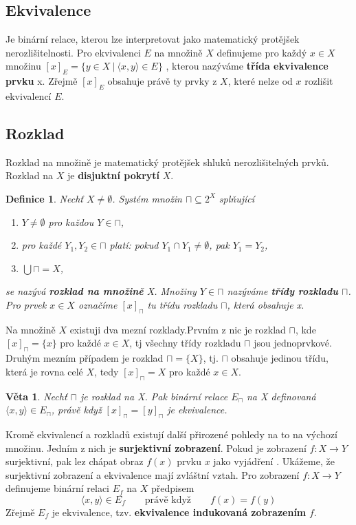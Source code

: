 \documentclass[12pt,a4paper]{article}
\newtheorem{definition}{Definice}
\newtheorem{sentence}{Věta}
\begin{document}
\subsection{Ekvivalence}
Je binární relace, kterou lze interpretovat jako matematický protějšek nerozlišitelnosti. Pro ekvivalenci $E$ na množině $X$ definujeme pro každý $x \in X$ množinu $[x]_E = \{ y \in X \ | \ \langle x, y \rangle \in E\} $
, kterou nazýváme \textbf{třída ekvivalence prvku} x. Zřejmě $[x]_E$ obsahuje právě ty prvky z $X$, které nelze od $x$ rozlišit ekvivalencí $E$.

\subsection{Rozklad}
Rozklad na množině je matematický protějšek shluků nerozlišitelných prvků. Rozklad na $X$ je \textbf{disjuktní pokrytí} $X$.

\begin{definition}
	Nechť $X \not= \emptyset$. Systém množin $\sqcap \subseteq 2^X$ splňující
	\begin{enumerate}
		\item $Y \not= \emptyset$ pro každou $Y \in \sqcap$,
		\item pro každé $Y_1,Y_2 \in \sqcap$ platí: pokud $Y_1 \cap Y_1 \not= \emptyset$, pak $Y_1 = Y_2$,
		\item $\bigcup\sqcap = X$,
	\end{enumerate}
	se nazývá \textbf{rozklad na množině} X. Množiny $Y \in \sqcap$ nazýváme \textbf{třídy rozkladu} $\sqcap$. Pro prvek $x \in X$ označíme $[x]_\sqcap$ tu třídu rozkladu $\sqcap$, která obsahuje x.
\end{definition}
Na množině $X$ existuji dva mezní rozklady.Prvním z nic je rozklad $\sqcap$, kde $[x]_\sqcap = \{x\}$ pro každé $x \in X$, tj všechny třídy rozkladu $\sqcap$ jsou jednoprvkové. Druhým mezním případem je rozklad $\sqcap = \{X\}$, tj. $\sqcap$ obsahuje jedinou třídu, která je rovna celé $X$, tedy $[x]_\sqcap = X$ pro každé $x \in X$.

\begin{sentence}
	Nechť $\sqcap$ je rozklad na X. Pak binární relace $E_\sqcap$ na X definovaná $\langle x,y \rangle \in E_\sqcap$, právě když $[x]_\sqcap = [y]_\sqcap$ je ekvivalence.
\end{sentence}

Kromě ekvivalencí a rozkladů existují další přirozené pohledy na to  na výchozí množinu. Jedním z nich je \textbf{surjektivní zobrazení}. Pokud je zobrazení $f : X \rightarrow Y$ surjektivní, pak lez chápat obraz $f(x)$ prvku $x$ jako vyjádření . Ukážeme, že surjektivní zobrazení a ekvivalence mají zvláštní vztah. Pro zobrazení $f : X \rightarrow Y$ definujeme binární relaci $E_f$ na $X$ předpisem $$\langle x , y \rangle \in E_f \qquad \text{právě když} \qquad f(x) = f(y)$$
Zřejmě $E_f$ je ekvivalence, tzv. \textbf{ekvivalence indukovaná zobrazením} $f$.
\end{document}
